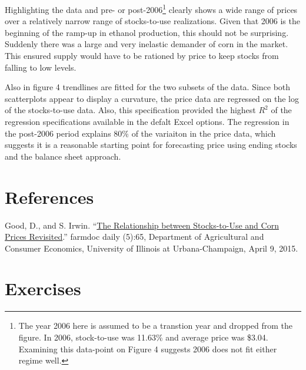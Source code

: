 \documentclass[
  letterpaper,
  DIV=11,
  numbers=noendperiod]{scrreprt}
\begin{document}
Highlighting the data and pre- or post-2006\footnote{The year 2006 here
  is assumed to be a transtion year and dropped from the figure. In
  2006, stock-to-use was 11.63\% and average price was \$3.04. Examining
  this data-point on Figure 4 suggests 2006 does not fit either regime
  well.} clearly shows a wide range of prices over a relatively narrow
range of stocks-to-use realizations. Given that 2006 is the beginning of
the ramp-up in ethanol production, this should not be surprising.
Suddenly there was a large and very inelastic demander of corn in the
market. This ensured supply would have to be rationed by price to keep
stocks from falling to low levels.

Also in figure 4 trendlines are fitted for the two subsets of the data.
Since both scatterplots appear to display a curvature, the price data
are regressed on the log of the stocks-to-use data. Also, this
specification provided the highest \(R^2\) of the regression
specifications available in the defalt Excel options. The regression in
the post-2006 period explains 80\% of the variaiton in the price data,
which suggests it is a reasonable starting point for forecasting price
using ending stocks and the balance sheet approach.

\section{References}\label{references}

Good, D., and S. Irwin.
``\href{http://farmdocdaily.illinois.edu/2015/04/relationship-stock-to-use-and-corn-prices.html}{The
Relationship between Stocks-to-Use and Corn Prices Revisited}.'' farmdoc
daily (5):65, Department of Agricultural and Consumer Economics,
University of Illinois at Urbana-Champaign, April 9, 2015.

\section{Exercises}\label{exercises-4}
\end{document}
